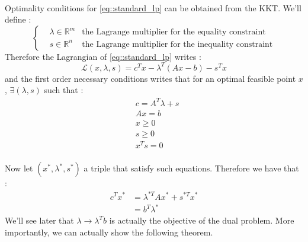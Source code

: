 \documentclass[a4paper]{article}
\newcommand\reflp{\eqref{eq::standard_lp}}
\begin{document}
{{{				\paragraph{} Optimality conditions for \reflp{} can be obtained from the KKT. We'll define : 
				$$
					\left\{
					\begin{aligned}
						&\lambda \in \mathbb{R}^m  &\text{the Lagrange multiplier for the equality constraint}\\
						&s\in\mathbb{R}^n &\text{the Lagrange multiplier for the inequality constraint}
					\end{aligned}\right.
				$$
				Therefore the Lagrangian of \reflp{} writes : 
				\begin{equation}
					\mathcal{L}(x,\lambda,s) = c^Tx - \lambda^T(Ax-b) -s^Tx 
				\end{equation}
				and the first order necessary conditions writes that for an optimal feasible point $x$, $\exists (\lambda,s)$ such that : 
				\begin{subequations}
					\label{eq::primal_kkt}
					\begin{align}
						&c = A^T \lambda +s \label{eq::dLdx}\\
						&Ax = b\label{eq:dLdl} \\
						& x\geq 0 \\
						& s \geq 0 \\
						& x^Ts = 0 \label{eq::complementarity} 
					\end{align}
				\end{subequations}
				
				\paragraph{} Now let $(x^*,\lambda^*,s^*)$ a triple that satisfy such equations. Therefore we have that : 
				$$ 
					\begin{aligned}
						c^Tx^* &= \lambda^{*T} Ax^* + s^{*T} x^* \\
							&= b^T\lambda^*			
					\end{aligned}
				$$
				We'll see later that $\lambda \to \lambda^Tb$ is actually the objective of the dual problem. More importantly, we can actually show the following theorem. 
				\vspace{10pt}
				
}}}
\end{document}
